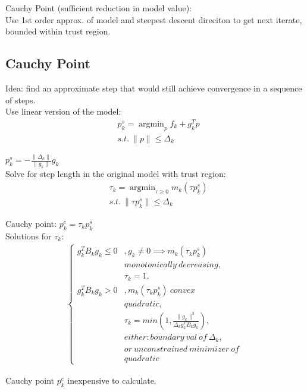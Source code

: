 \documentclass[8pt,letter]{article}
\DeclareMathOperator*{\argmin}{argmin}
\begin{document}
\begin{multicols*}{2}
  Cauchy Point (sufficient reduction in model value):\\
  Use 1st order approx. of model and steepest descent direciton to get next iterate, bounded within trust region.\\

  \vfill\null
  \pagebreak
    
  \subsection{Cauchy Point}
  Idea: find an approximate step that would still achieve convergence in a sequence of steps.\\
  Use linear version of the model:
  \begin{align*}
    & p_k^s = \argmin_p f_k + g_k^T p\\
    & s.t.\ \|p\| \leq \Delta_k
  \end{align*}

  $p_k^s = - \frac{\|\Delta_k\|}{\|g_k\|} g_k$\\

  Solve for step length in the original model with trust region:
  \begin{align*}
    & \tau_k = \argmin_{\tau \geq 0 } m_k(\tau p_k^s)\\
    & s.t.\ \|\tau p_k^s\| \leq \Delta_k
  \end{align*}

  Cauchy point: $p_k^c = \tau_k p_k^s$\\

  Solutions for $\tau_k$:
  \begin{align*}
  \begin{cases}
    g_k^T B_k g_k \leq 0 &, g_k \neq 0 \implies m_k(\tau_k p_k^s)\\
    & monotonically\ decreasing,\\
    & \tau_k = 1,\\
    g_k^T B_k g_k > 0 &, m_k(\tau_k p_k^s)\ convex\ \\
    & quadratic,\\
    & \tau_k=min(1, \frac{\|g_k\|^3}{\Delta_k g_k^T B_k g_k}),\\
    & either: boundary\ val\ of\ \Delta_k,\\
    & or\ unconstrained\ minimizer\ of\ \\
    & quadratic
  \end{cases}
  \end{align*}

  Cauchy point $p_k^c$ inexpensive to calculate.\\


\end{multicols*}
\end{document}
